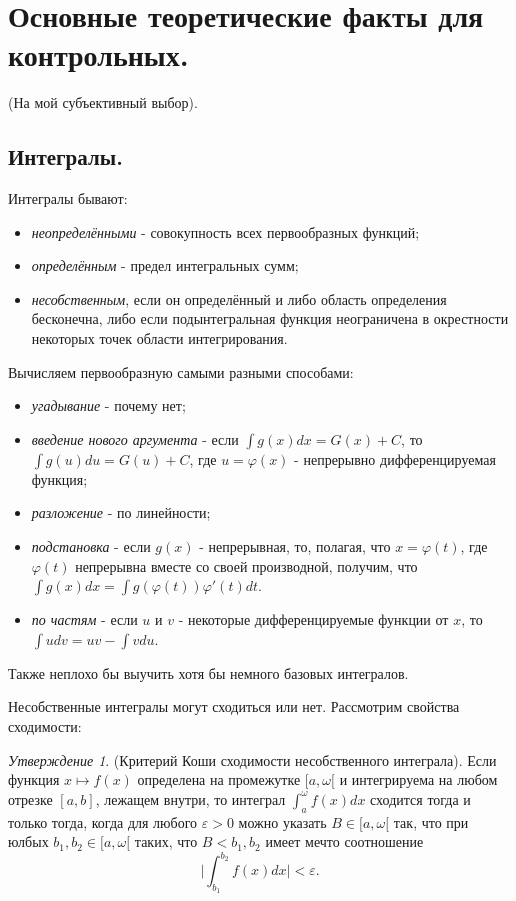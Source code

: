 \documentclass[a4paper,100pt]{article}
\theoremstyle{indented}
\theoremstyle{definition}
\theoremstyle{remark}
\newtheorem{stat}{Утверждение}
\begin{document}
\newpage

\section{Основные теоретические факты для контрольных.}

(На мой субъективный выбор). \ 

\subsection{Интегралы.}

Интегралы бывают: \ 

\begin{itemize}
    \item \textit{неопределёнными} - совокупность всех первообразных функций;
    \item \textit{определённым} - предел интегральных сумм;
    \item \textit{несобственным}, если он определённый и либо область определения бесконечна, либо если подынтегральная функция неограничена в окрестности некоторых точек области интегрирования. 
\end{itemize}

Вычисляем первообразную самыми разными способами: \

\begin{itemize}
    \item \textit{угадывание} - почему нет;
    \item \textit{введение нового аргумента} - если $\int g(x)dx = G(x)+C$, то $\int g(u)du = G(u)+C$, где $u = \varphi(x)$ - непрерывно дифференцируемая функция;
    \item \textit{разложение} - по линейности;
    \item \textit{подстановка} - если $g(x)$ - непрерывная, то, полагая, что $x=\varphi(t)$, где $\varphi(t)$ непрерывна вместе со своей производной, получим, что $\int g(x)dx = \int g(\varphi(t))\varphi'(t)dt$. 
    \item \textit{по частям} - если $u$ и $v$ - некоторые дифференцируемые функции от $x$, то $\int udv = uv - \int vdu$. 
\end{itemize}

Также неплохо бы выучить хотя бы немного базовых интегралов. \ 

Несобственные интегралы могут сходиться или нет. Рассмотрим свойства сходимости: \ 

\begin{stat}
    (Критерий Коши сходимости несобственного интеграла). Если функция $x\mapsto f(x)$ определена на промежутке $[a, \omega[$ и интегрируема на любом отрезке $[a, b]$, лежащем внутри, то интеграл $\int_a^\omega f(x)dx$ сходится тогда и только тогда, когда для любого $\varepsilon>0$ можно указать $B\in [a, \omega[$ так, что при юлбых $b_1, b_2\in [a, \omega[$ таких, что $B<b_1, b_2$ имеет мечто соотношение 
    \[
        \bigg| \int_{b_1}^{b_2}f(x)dx\bigg| < \varepsilon. 
    \]
\end{stat}
\end{document}
